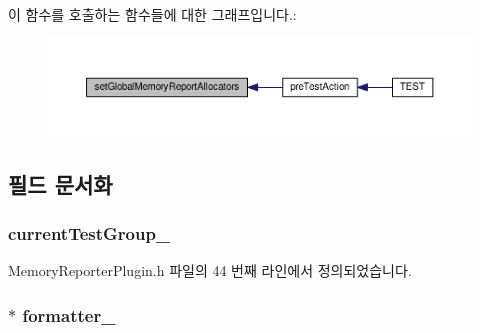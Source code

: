 이 함수를 호출하는 함수들에 대한 그래프입니다.\+:
\nopagebreak
\begin{figure}[H]
\begin{center}
\leavevmode
\includegraphics[width=350pt]{class_memory_reporter_plugin_ad370cc906e33aa1c0d154a801821f0e3_icgraph}
\end{center}
\end{figure}




\subsection{필드 문서화}
\subsubsection[{\texorpdfstring{current\+Test\+Group\+\_\+}{currentTestGroup_}}]{ current\+Test\+Group\+\_\+\hspace{0.3cm}{\ttfamily [private]}}\hypertarget{class_memory_reporter_plugin_a4733051c1386e53d8d11c6b35922dbc7}{}\label{class_memory_reporter_plugin_a4733051c1386e53d8d11c6b35922dbc7}


Memory\+Reporter\+Plugin.\+h 파일의 44 번째 라인에서 정의되었습니다.

\subsubsection[{\texorpdfstring{formatter\+\_\+}{formatter_}}]{$\ast$ formatter\+\_\+\hspace{0.3cm}{\ttfamily [private]}}\hypertarget{class_memory_reporter_plugin_a09aec3af9ca6c3c27226a1aaaea13987}{}\label{class_memory_reporter_plugin_a09aec3af9ca6c3c27226a1aaaea13987}


